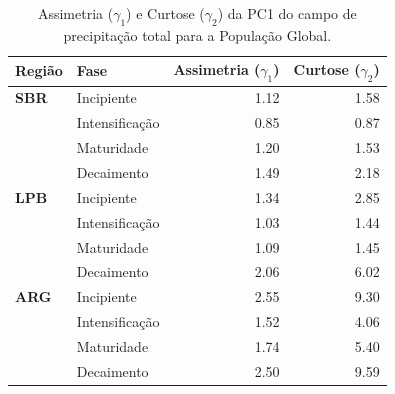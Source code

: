\begin{table}[htbp]
\centering
\caption[Momentos estatísticos da PC1 de precipitação --- População Global]{Assimetria ($\gamma_1$) e Curtose ($\gamma_2$) da PC1 do campo de precipitação total para a População Global.}
\label{tab:momentos_global_tp}
\begin{tabular*}{\textwidth}{@{\extracolsep{\fill}}llrr}
\hline
\textbf{Região} & \textbf{Fase} & \textbf{Assimetria ($\gamma_1$)} & \textbf{Curtose ($\gamma_2$)} \\
\hline
\textbf{SBR} & Incipiente & 1.12 & 1.58 \\
 & Intensificação & 0.85 & 0.87 \\
 & Maturidade & 1.20 & 1.53 \\
 & Decaimento & 1.49 & 2.18 \\
\hline
\textbf{LPB} & Incipiente & 1.34 & 2.85 \\
 & Intensificação & 1.03 & 1.44 \\
 & Maturidade & 1.09 & 1.45 \\
 & Decaimento & 2.06 & 6.02 \\
\hline
\textbf{ARG} & Incipiente & 2.55 & 9.30 \\
 & Intensificação & 1.52 & 4.06 \\
 & Maturidade & 1.74 & 5.40 \\
 & Decaimento & 2.50 & 9.59 \\
\hline
\end{tabular*}
\end{table}